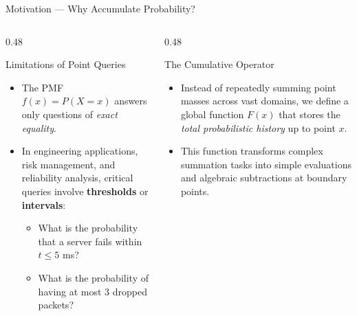\documentclass[aspectratio=169,xcolor={dvipsnames,table}]{beamer}
\begin{document}
\begin{frame}{Motivation --- Why Accumulate Probability?}
	\begin{columns}[T]
		\begin{column}{0.48\textwidth}
			\begin{block}{Limitations of Point Queries}
				\small
				\begin{itemize}
					\itemsep=0.06cm
					\item The PMF $f(x) = P(X=x)$ answers only questions of \emph{exact equality}.
					\item In engineering applications, risk management, and reliability analysis, critical queries involve \textbf{thresholds} or \textbf{intervals}:
					\begin{itemize}
						\item \scriptsize What is the probability that a server fails within $t \le 5$ ms?
						\item \scriptsize What is the probability of having at most $3$ dropped packets?
					\end{itemize}
				\end{itemize}
			\end{block}
		\end{column}
		\begin{column}{0.48\textwidth}
			\begin{block}{The Cumulative Operator}
				\small
				\begin{itemize}
					\itemsep=0.06cm
					\item Instead of repeatedly summing point masses across vast domains, we define a global function $F(x)$ that stores the \emph{total probabilistic history} up to point $x$.
					\item This function transforms complex summation tasks into simple evaluations and algebraic subtractions at boundary points.
				\end{itemize}
			\end{block}
		\end{column}
	\end{columns}
\end{frame}
\end{document}
